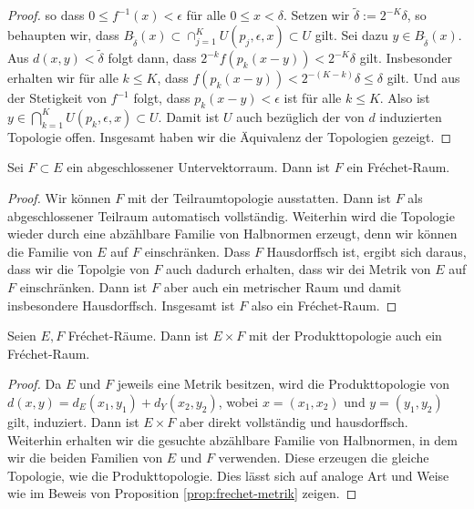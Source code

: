 \begin{proof}
  so dass $0 \leq f^{-1}(x) < \epsilon$ für alle $0 \leq x <
  \delta$. Setzen wir $\tilde \delta := 2^{-K} \delta$, so behaupten
  wir, dass $B_{\tilde \delta}(x) \subset \cap_{j=1}^K U(p_j,
    \epsilon, x) \subset U$ gilt. Sei dazu $y \in B_{\tilde
      \delta}(x)$. Aus $d(x,y) < \tilde \delta$ folgt dann, dass
    $2^{-k} f(p_k(x-y)) < 2^{-K} \delta$ gilt. Insbesonder erhalten
    wir für alle $k \leq K$, dass $f(p_k(x-y)) < 2^{-(K-k)} \delta
    \leq \delta$ gilt. Und aus der Stetigkeit von $f^{-1}$ folgt, dass
    $p_k(x-y) < \epsilon$ ist für alle $k \leq K$. Also ist $y \in
    \bigcap_{k=1}^K U(p_k, \epsilon, x) \subset U$. Damit ist $U$ auch
    bezüglich der von $d$ induzierten Topologie offen. Insgesamt haben
    wir die Äquivalenz der Topologien gezeigt.
\end{proof}
  
\begin{thm}
  \label{thm:frechet-abgeschlossen}
  Sei $F \subset E$ ein abgeschlossener Untervektorraum. Dann ist $F$
  ein Fr\'echet-Raum.
\end{thm}

\begin{proof}
  Wir können $F$ mit der Teilraumtopologie ausstatten. Dann ist $F$
  als abgeschlossener Teilraum automatisch vollständig. Weiterhin wird
  die Topologie wieder durch eine abzählbare Familie von Halbnormen
  erzeugt, denn wir können die Familie von $E$ auf $F$
  einschränken. Dass $F$ Hausdorffsch ist, ergibt sich daraus, dass
  wir die Topolgie von $F$ auch dadurch erhalten, dass wir dei Metrik
  von $E$ auf $F$ einschränken. Dann ist $F$ aber auch ein metrischer
  Raum und damit insbesondere Hausdorffsch. Insgesamt ist $F$ also ein
  Fr\'echet-Raum.
\end{proof}

\begin{thm}
  \label{thm:frechet-summe}
  Seien $E, F$ Fr\'echet-Räume. Dann ist $E \times F$ mit der
  Produkttopologie auch ein Fr\'echet-Raum.
\end{thm}

\begin{proof}
  Da $E$ und $F$ jeweils eine Metrik besitzen, wird die
  Produkttopologie von $d(x,y) = d_E(x_1, y_1) + d_Y(x_2, y_2)$, wobei
  $x = (x_1,x_2)$ und $y = (y_1, y_2)$ gilt, induziert. Dann ist $E
  \times F$ aber direkt vollständig und hausdorffsch. Weiterhin
  erhalten wir die gesuchte abzählbare Familie von Halbnormen, in dem
  wir die beiden Familien von $E$ und $F$ verwenden. Diese erzeugen
  die gleiche Topologie, wie die Produkttopologie. Dies lässt sich auf
  analoge Art und Weise wie im Beweis von Proposition
  \ref{prop:frechet-metrik} zeigen.
\end{proof}

